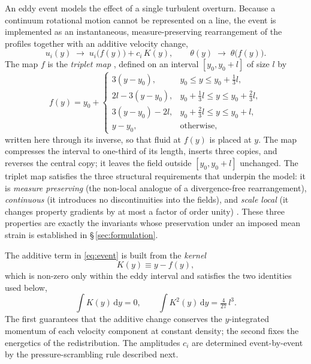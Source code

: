 \documentclass[lineno]{JFM-FLM_Au}
\begin{document}
An eddy event models the effect of a single turbulent overturn. Because a
continuum rotational motion cannot be represented on a line, the event is
implemented as an instantaneous, measure-preserving rearrangement of the
profiles together with an additive velocity change,
\begin{equation}
  u_i(y)\;\longrightarrow\;u_i\!\big(f(y)\big)+c_i\,K(y),
  \qquad
  \theta(y)\;\longrightarrow\;\theta\!\big(f(y)\big).
  \label{eq:event}
\end{equation}
The map $f$ is the \emph{triplet map} \citep{Kerstein1991,Kerstein1999},
defined on an interval $[y_0,y_0+l]$ of size $l$ by
\begin{equation}
  f(y)=y_0+
  \begin{cases}
    3(y-y_0), & y_0\le y\le y_0+\tfrac{1}{3}l,\\[2pt]
    2l-3(y-y_0), & y_0+\tfrac{1}{3}l\le y\le y_0+\tfrac{2}{3}l,\\[2pt]
    3(y-y_0)-2l, & y_0+\tfrac{2}{3}l\le y\le y_0+l,\\[2pt]
    y-y_0, & \text{otherwise,}
  \end{cases}
  \label{eq:triplet}
\end{equation}
written here through its inverse, so that fluid at $f(y)$ is placed at $y$.
The map compresses the interval to one-third of its length, inserts three
copies, and reverses the central copy; it leaves the field outside
$[y_0,y_0+l]$ unchanged. The triplet map satisfies the three structural
requirements that underpin the model: it is \emph{measure preserving} (the
non-local analogue of a divergence-free rearrangement), \emph{continuous}
(it introduces no discontinuities into the fields), and \emph{scale local}
(it changes property gradients by at most a factor of order unity)
\citep{Kerstein2001}. These three properties are exactly the invariants
whose preservation under an imposed mean strain is established in
\S\,\ref{sec:formulation}.

The additive term in \eqref{eq:event} is built from the \emph{kernel}
\begin{equation}
  K(y)\equiv y-f(y),
  \label{eq:kernel}
\end{equation}
which is non-zero only within the eddy interval and satisfies the two
identities used below,
\begin{equation}
  \int K(y)\,\mathrm{d}y = 0,
  \qquad
  \int K^2(y)\,\mathrm{d}y = \tfrac{4}{27}\,l^{3}.
  \label{eq:kernel-identities}
\end{equation}
The first guarantees that the additive change conserves the $y$-integrated
momentum of each velocity component at constant density; the second fixes
the energetics of the redistribution. The amplitudes $c_i$ are determined
event-by-event by the pressure-scrambling rule described next.
\end{document}
